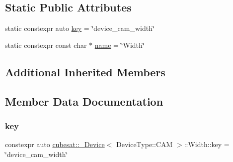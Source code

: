 \subsection*{Static Public Attributes}
\begin{DoxyCompactItemize}
\item 
static constexpr auto \hyperlink{structcubesat_1_1__Device_3_01DeviceType_1_1CAM_01_4_1_1Width_a94415972d2ec84d7f2e8949d46fa1bdf}{key} = \char`\"{}device\+\_\+cam\+\_\+width\char`\"{}
\item 
static constexpr const char $\ast$ \hyperlink{structcubesat_1_1__Device_3_01DeviceType_1_1CAM_01_4_1_1Width_a347a8064b23be3d3afd601b550c227ec}{name} = \char`\"{}Width\char`\"{}
\end{DoxyCompactItemize}
\subsection*{Additional Inherited Members}


\subsection{Member Data Documentation}
\mbox{\label{structcubesat_1_1__Device_3_01DeviceType_1_1CAM_01_4_1_1Width_a94415972d2ec84d7f2e8949d46fa1bdf}} 
\subsubsection{\texorpdfstring{key}{key}}
{\footnotesize\ttfamily constexpr auto \hyperlink{structcubesat_1_1__Device}{cubesat\+::\+\_\+\+Device}$<$ Device\+Type\+::\+C\+AM $>$\+::Width\+::key = \char`\"{}device\+\_\+cam\+\_\+width\char`\"{}\hspace{0.3cm}{\ttfamily [static]}}

\mbox{\label{structcubesat_1_1__Device_3_01DeviceType_1_1CAM_01_4_1_1Width_a347a8064b23be3d3afd601b550c227ec}} 
